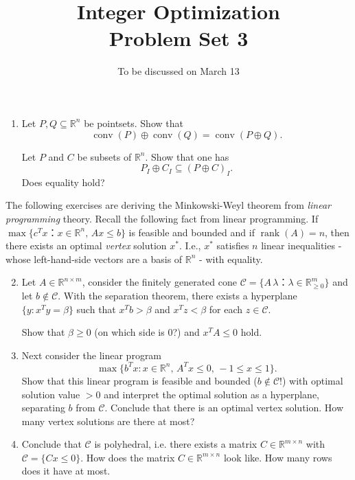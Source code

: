 \documentclass[11pt,a4paper]{article}
\title{Integer Optimization  \\ Problem Set 3 }
\date{To be discussed on March 13}
\DeclareMathOperator{\conv}{conv}
\DeclareMathOperator{\rank}{rank}
\begin{document}
\maketitle 




\begin{enumerate} 
\item Let $P,Q ⊆ ℝ^n$ be pointsets.  Show that
  \begin{displaymath}
    \conv(P) ⊕ \conv(Q) = \conv(P ⊕Q). 
  \end{displaymath}

 Let $P$ and $C$ be  subsets of $ℝ^n$. Show that one has 
  \begin{displaymath}
    P_I ⊕ C_I ⊆ (P ⊕ C)_I.
  \end{displaymath}
  Does equality hold? 
\end{enumerate}

\noindent
The following exercises are deriving the Minkowski-Weyl theorem from \emph{linear programming } theory. %
Recall the following fact from linear programming. If $\max\{ c^T x ：x ∈ ℝ^n, \,Ax ≤ b\}$ is feasible and bounded and if $\rank(A) = n$, then there exists an optimal \emph{vertex} solution $x^*$. I.e., $x^*$ satisfies $n$ linear inequalities - whose left-hand-side vectors are a basis of $ℝ^n$ - with equality. 


\begin{enumerate}
  \setcounter{enumi}{1}
\item Let $A ∈ ℝ^{n ×m}$, consider the finitely generated cone $\mathscr{C} = \{ A\,  λ ： λ ∈ ℝ^m_{≥0}\}$ and let $b ∉ \mathscr{C} $. With the separation theorem, there exists a hyperplane $\{ y : x^T y = β\}$ such that $x^T b > β$ and $x^T z < β$ for each $z ∈  \mathscr{C}$.

  Show that $β≥0$ (on which side is $0$?)  and  $x^T A ≤ 0$ hold.

\item Next consider the linear program
  \begin{displaymath}
     \max\{ b^T x : x ∈ ℝ^n, \,  A^T x ≤ 0, \,  -1 ≤ x ≤ 1\}. 
   \end{displaymath}
   Show that this linear program is feasible and bounded ($b ∉ \mathscr{C}$!) with optimal solution value $>0$ and interpret the optimal solution as a hyperplane, separating $b$ from $\mathscr{C}$. Conclude that there is an optimal vertex solution. How many vertex solutions are there at most?
 \item Conclude that $ \mathscr{C}$ is polyhedral, i.e. there exists a matrix $C ∈ ℝ^{m ×n}$ with $\mathscr{C} = \{ Cx ≤0\}$. How does the matrix $C ∈ ℝ^{m ×n}$ look like. How many rows does it have at most. 
   
 \end{enumerate}
\end{document}
